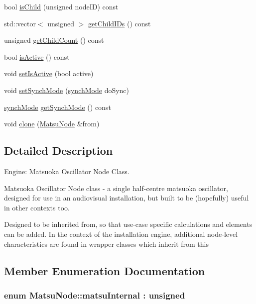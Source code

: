 \begin{DoxyCompactItemize}
\item 
bool \hyperlink{classMatsuNode_a26257c8dac98a26bf387be01fcb3303b}{is\+Child} (unsigned node\+ID) const 
\item 
std\+::vector$<$ unsigned $>$ \hyperlink{classMatsuNode_adfc64a6ec3f6b7345f912a100b0db2da}{get\+Child\+I\+Ds} () const 
\item 
unsigned \hyperlink{classMatsuNode_a12a74c9ae4878ce22ddd71a184b89dc7}{get\+Child\+Count} () const 
\item 
bool \hyperlink{classMatsuNode_afb5c32542260b639603f5520df785559}{is\+Active} () const 
\item 
void \hyperlink{classMatsuNode_a120dfca98155fded8d1ccac0f5236ecd}{set\+Is\+Active} (bool active)
\item 
void \hyperlink{classMatsuNode_a31c979f10f4c1482204ec19a2868caf1}{set\+Synch\+Mode} (\hyperlink{classMatsuNode_a725e228db39b8842f851ddf88f640bed}{synch\+Mode} do\+Sync)
\item 
\hyperlink{classMatsuNode_a725e228db39b8842f851ddf88f640bed}{synch\+Mode} \hyperlink{classMatsuNode_a82c432b9ec0637454ee337b06e0d1be7}{get\+Synch\+Mode} () const 
\item 
void \hyperlink{classMatsuNode_a540f3663464549a9dba2c4b41d9930de}{clone} (\hyperlink{classMatsuNode}{Matsu\+Node} \&from)
\end{DoxyCompactItemize}


\subsection{Detailed Description}
Engine\+: Matsuoka Oscillator Node Class. 

Matsuoka Oscillator Node class -\/ a single half-\/centre matsuoka oscillator, designed for use in an audiovisual installation, but built to be (hopefully) useful in other contexts too.

Designed to be inherited from, so that use-\/case specific calculations and elements can be added. In the context of the installation engine, additional node-\/level characteristics are found in wrapper classes which inherit from this 

\subsection{Member Enumeration Documentation}
\subsubsection[{\texorpdfstring{matsu\+Internal}{matsuInternal}}]{\setlength{\rightskip}{0pt plus 5cm}enum {\bf Matsu\+Node\+::matsu\+Internal} \+: unsigned\hspace{0.3cm}{\ttfamily [strong]}}\hypertarget{classMatsuNode_a5899aeb63b46cd45b1dc825ad518289a}{}\label{classMatsuNode_a5899aeb63b46cd45b1dc825ad518289a}


